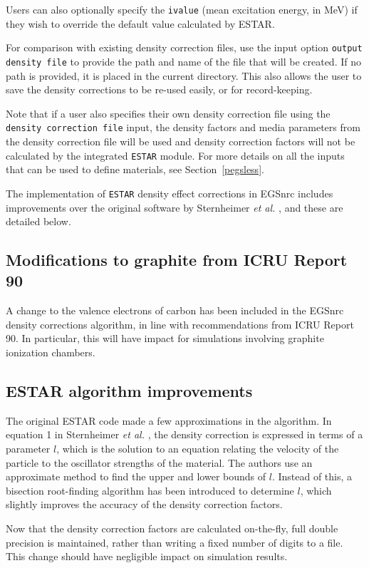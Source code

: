 Users can also optionally specify the {\tt ivalue} (mean excitation energy, in MeV) if they wish to override the default value calculated by ESTAR.

For comparison with existing density correction files, use the input option {\tt output density file} to provide the path and name of the file that will be created. If no path is provided, it is placed in the current directory. This also allows the user to save the density corrections to be re-used easily, or for record-keeping.

Note that if a user also specifies their own density correction file using the {\tt density correction file} input, the density factors and media parameters from the density correction file will be used and density correction factors will not be calculated by the integrated {\tt ESTAR} module. For more details on all the inputs that can be used to define materials, see Section~\ref{pegsless}.

The implementation of {\tt ESTAR} density effect corrections in EGSnrc includes improvements over the original software by Sternheimer {\em et al.} \cite{St82}, and these are detailed below.

\subsection{Modifications to graphite from ICRU Report 90}
A change to the valence electrons of carbon has been included in the EGSnrc density corrections algorithm, in line with recommendations from ICRU Report 90. In particular, this will have impact for simulations involving graphite ionization chambers.

\subsection{ESTAR algorithm improvements}
The original ESTAR code made a few approximations in the algorithm. In equation 1 in Sternheimer {\em et al.} \cite{St82}, the density correction is expressed in terms of a parameter $l$, which is the solution to an equation relating the velocity of the particle to the oscillator strengths of the material. The authors use an approximate method to find the upper and lower bounds of $l$. Instead of this, a bisection root-finding algorithm has been introduced to determine $l$, which slightly improves the accuracy of the density correction factors.

Now that the density correction factors are calculated on-the-fly, full double precision is maintained, rather than writing a fixed number of digits to a file. This change should have negligible impact on simulation results.


